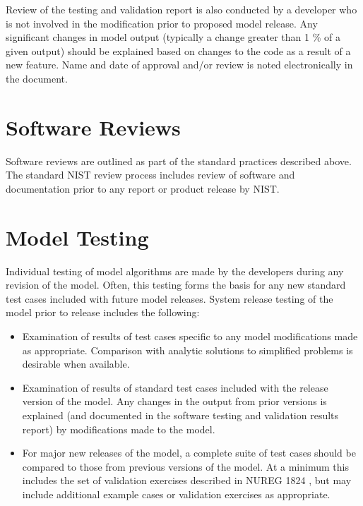 \documentclass[12pt]{book}
\begin{document}
Review of the testing and validation report is also conducted by a developer who is not involved in the modification prior to proposed model release. Any significant changes in model output (typically a change greater than 1 \% of a given output) should be explained based on changes to the code as a result of a new feature.  Name and date of approval and/or review is noted electronically in the document.

\section{Software Reviews}

Software reviews are outlined as part of the standard practices described above.  The standard NIST review process includes review of software and documentation prior to any report or product release by NIST.

\section{Model Testing}

Individual testing of model algorithms are made by the developers during any revision of the model. Often, this testing forms the basis for any new standard test cases included with future model releases. System release testing of the model prior to release includes the following:

\begin{itemize}
\item Examination of results of test cases specific to any model modifications made as appropriate.  Comparison with analytic solutions to simplified problems is desirable when available.

\item Examination of results of standard test cases included with the release version of the model. Any changes in the output from prior versions is explained (and documented in the software testing and validation results report) by modifications made to the model.

\item For major new releases of the model, a complete suite of test cases should be compared to those from previous versions of the model.  At a minimum this includes the set of validation exercises described in NUREG 1824 \cite{NRCNUREG1824}, but may include additional example cases or validation exercises as appropriate.
\end{itemize}
\end{document}
